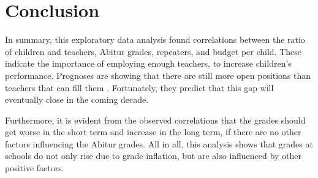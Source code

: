 \section{Conclusion}
In summary, this exploratory data analysis found correlations between the ratio of children and teachers, Abitur grades, repeaters, and budget per child. These indicate the importance of employing enough teachers, to increase children's performance. Prognoses are  showing that there are still more open positions than teachers that can fill them \cite{kultusminister_konferenz_lehrkrafteeinstellungsbedarf_2023}. Fortunately, they predict that this gap will eventually close in the coming decade. 

Furthermore, it is evident from the observed correlations that the grades should get worse in the short term and increase in the long term, if there are no other factors influencing the Abitur grades. All in all, this analysis shows that grades at schools do not only rise due to grade inflation, but are also influenced by other positive factors.



